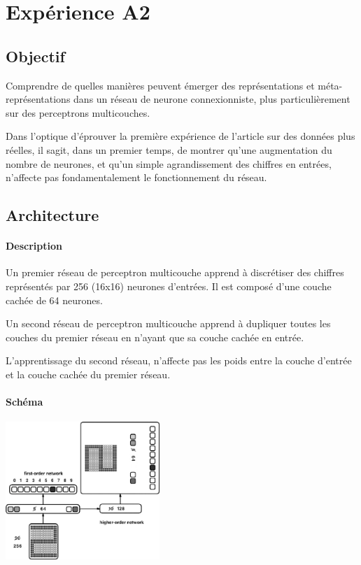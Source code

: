 \section{Expérience A2} \label{expA2}
  \subsection{Objectif}
    Comprendre de quelles manières peuvent émerger des représentations et méta-représentations dans 
    un réseau de neurone connexionniste, plus particulièrement sur des perceptrons multicouches.
    
    Dans l'optique d'éprouver la première expérience de l'article \cite{Cleeremans_2007} sur des
    données plus réelles, il sagit, dans un premier temps, de montrer qu'une augmentation du 
    nombre de neurones, et qu'un simple agrandissement des chiffres en entrées, 
    n'affecte pas fondamentalement le fonctionnement du réseau.

  \subsection{Architecture}
    \paragraph{Description}
      Un premier réseau de perceptron multicouche apprend à discrétiser des chiffres représentés
      par 256 (16x16) neurones d'entrées. Il est composé d'une couche cachée de 64 neurones.
      
      Un second réseau de perceptron multicouche apprend à dupliquer toutes les couches du premier
      réseau en n'ayant que sa couche cachée en entrée.
      
      L'apprentissage du second réseau, n'affecte pas les poids entre la couche d'entrée et la 
      couche cachée du premier réseau.

    \paragraph{Schéma}
      \begin{center}
	\includegraphics[width=220px]{data/expA2/schema.png}
      \end{center}
      

